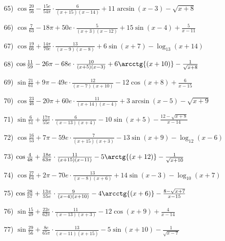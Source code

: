 \documentclass[11pt,ukrainian]{article}
\begin{document}
65) \space 
{ ${\cos\frac{20}{56}} - \frac{15 e}{54{\pi}}\cdot {\frac{6}{(x + 15)(x - 14)}} + {11\arcsin{(x - 3)}} - {\sqrt{x + 8}}$}
\smallskip\par
66) \space 
{ ${\cos\frac{7}{63}} - 18{\pi} + 50 e\cdot {\frac{5}{(x + 3)(x - 12)}} + {15\sin{(x - 4)}} + { \frac{5}{x - 11}}$}
\smallskip\par
67) \space 
{ ${\cos\frac{19}{66}} + \frac{14{\pi}}{70 e}\cdot {\frac{13}{(x - 9)(x - 8)}} + {6\sin{(x + 7)}} - {\log_{13}(x + 14)}$}
\smallskip\par
68) \space 
{ ${\cos\frac{11}{59}} - 26{\pi} - 68 e\cdot {\frac{10}{(x + 5)(x - 3)}} + {6\arcctg{(x + 10)}} - {\frac{1}{\sqrt{x + 8}}}$}
\smallskip\par
69) \space 
{ ${\sin\frac{21}{61}} + 9{\pi} - 49 e\cdot {\frac{12}{(x - 7)(x + 10)}} - {12\cos{(x + 8)}} + { \frac{6}{x - 15}}$}
\smallskip\par
70) \space 
{ ${\cos\frac{23}{46}} - 20{\pi} + 60 e\cdot {\frac{11}{(x + 14)(x - 4)}} + {3\arcsin{(x - 5)}} - {\sqrt{x + 9}}$}
\smallskip\par
71) \space 
{ ${\sin\frac{6}{51}} + \frac{17{\pi}}{55 e}\cdot {\frac{6}{(x - 13)(x + 4)}} - {10\sin{(x + 5)}} - {\frac{12 - \sqrt{x + 8}}{x - 14}}$}
\smallskip\par
72) \space 
{ ${\cos\frac{16}{53}} + 7{\pi} - 59 e\cdot {\frac{7}{(x + 15)(x + 3)}} - {13\sin{(x + 9)}} - {\log_{12}(x - 6)}$}
\smallskip\par
73) \space 
{ ${\cos\frac{4}{48}} + \frac{18 e}{63{\pi}}\cdot {\frac{11}{(x + 15)(x - 11)}} - {5\arctg{(x + 12)}} - {\frac{1}{\sqrt{x + 10}}}$}
\smallskip\par
74) \space 
{ ${\cos\frac{27}{64}} + 2{\pi} - 70 e\cdot {\frac{13}{(x - 8)(x + 6)}} + {14\sin{(x - 3)}} - {\log_{10}(x + 7)}$}
\smallskip\par
75) \space 
{ ${\cos\frac{28}{57}} + \frac{13{\pi}}{55 e}\cdot {\frac{9}{(x - 4)(x + 10)}} - {4\arcctg{(x + 6)}} - {\frac{8 - \sqrt{x + 7}}{x - 15}}$}
\smallskip\par
76) \space 
{ ${\sin\frac{15}{49}} + \frac{22 e}{62{\pi}}\cdot {\frac{11}{(x - 13)(x + 3)}} - {12\cos{(x + 9)}} + { \frac{4}{x - 14}}$}
\smallskip\par
77) \space 
{ ${\sin\frac{29}{56}} + \frac{8 e}{65{\pi}}\cdot {\frac{13}{(x - 11)(x + 15)}} - {5\sin{(x + 10)}} - {\frac{1}{\sqrt{x - 7}}}$}
\smallskip\par
\end{document}
